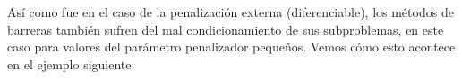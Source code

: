 
Así como fue en el caso de la penalización externa (diferenciable), los métodos de barreras también sufren del mal condicionamiento de sus subproblemas, en este caso para valores del parámetro penalizador pequeños. Vemos cómo esto acontece en el ejemplo siguiente.

